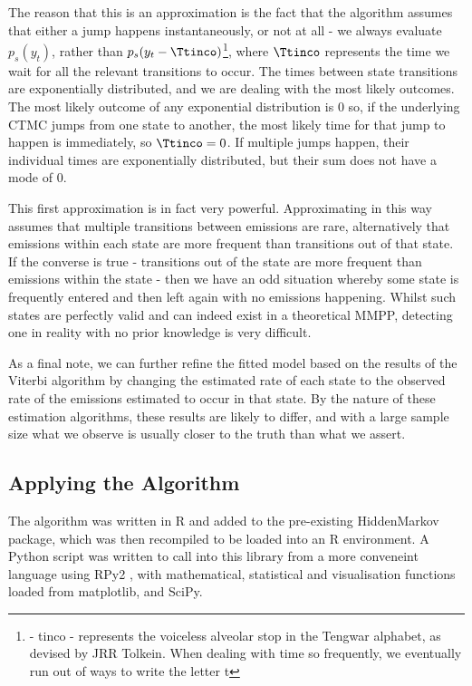 The reason that this is an approximation is the fact that the algorithm assumes that either a jump happens instantaneously, or not at all - we always evaluate $p_s(y_t)$, rather than $p_s(y_t-\tengt)$\footnote{\tengt - tinco - represents the voiceless alveolar stop in the Tengwar alphabet, as devised by JRR Tolkein. When dealing with time so frequently, we eventually run out of ways to write the letter t}, where $\tengt$ represents the time we wait for all the relevant transitions to occur. The times between state transitions are exponentially distributed, and we are dealing with the most likely outcomes. The most likely outcome of any exponential distribution is $0$ so, if the underlying CTMC jumps from one state to another, the most likely time for that jump to happen is immediately, so $\tengt = 0$. If multiple jumps happen, their individual times are exponentially distributed, but their sum does not have a mode of 0.

This first approximation is in fact very powerful. Approximating in this way assumes that multiple transitions between emissions are rare, alternatively  that emissions within each state are more frequent than transitions out of that state. If the converse is true - transitions out of the state are more frequent than emissions within the state - then we have an odd situation whereby some state is frequently entered and then left again with no emissions happening. Whilst such states are perfectly valid and can indeed exist in a theoretical MMPP, detecting one in reality with no prior knowledge is very difficult.

As a final note, we can further refine the fitted model based on the results of the Viterbi algorithm by changing the estimated rate of each state to the observed rate of the emissions estimated to occur in that state. By the nature of these estimation algorithms, these results are likely to differ, and with a large sample size what we observe is usually closer to the truth than what we assert.

\subsection{Applying the Algorithm}

The algorithm was written in R and added to the pre-existing HiddenMarkov \cite{hiddenmarkov}
package, which was then recompiled to be loaded into an R environment. A Python script was written to call into this library from a more conveneint language using RPy2 \cite{rpy}, with mathematical, statistical and visualisation functions loaded from matplotlib\cite{matplotlib}, and SciPy\cite{scipy}.

